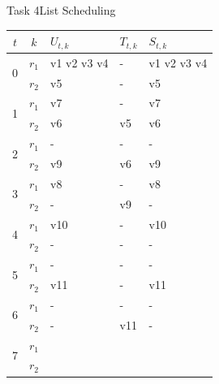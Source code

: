 \begin{frame}{Task 4}{List Scheduling}
  \begin{solutionnoinc}
    \centering
    \tiny
    \begin{tabular}{c|c|l|l|l|}
    \hline$t$ & $k$ & $U_{t, k}$ & $T_{t, k}$ & $S_{t, k}$ \\
    \hline \multirow{2}{*}{0} & $r_1$ & v1 v2 v3 v4 & - & v1 v2 v3 v4\\
    \cline { 2 - 5 } & $r_2$ & v5 & - & v5 \\
    \hline \multirow{2}{*}{1} & $r_1$ & v7 & - & v7 \\
    \cline { 2 - 5 } & $r_2$ & v6 & v5 & v6 \\
    \hline \multirow{2}{*}{2} & $r_1$ & - & - & - \\
    \cline { 2 - 5 } & $r_2$ & v9 & v6 & v9 \\
    \hline \multirow{2}{*}{3} & $r_1$ & v8 & - & v8 \\
    \cline { 2 - 5 } & $r_2$ & - & v9 & - \\
    \hline \multirow{2}{*}{4} & $r_1$ & v10 & - & v10 \\
    \cline { 2 - 5 }  & $r_2$ & - & - & - \\
    \hline \multirow{2}{*}{5} & $r_1$ & - & - & - \\
    \cline { 2 - 5 } & $r_2$ & v11 & - & v11 \\
    \hline \multirow{2}{*}{6} & $r_1$ & - & - & - \\
    \cline { 2 - 5 } & $r_2$ & - & v11 & - \\
    \hline \multirow{2}{*}{7} & $r_1$ & & & \\
    \cline { 2 - 5 } & $r_2$ & & & \\
    \hline
    \end{tabular}
  \end{solutionnoinc}
\end{frame}
